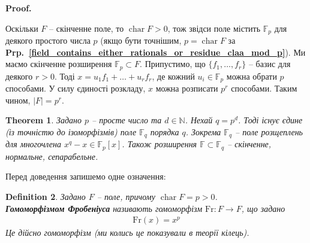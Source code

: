\documentclass[a4paper, 10pt]{article}
\makeatletter
\theoremstyle{theoremdd}
\newtheorem{theorem}{Theorem}[subsection]
\theoremstyle{theoremdd}
\newtheorem{definition}[theorem]{Definition}
\theoremstyle{theoremdd}
\theoremstyle{theoremdd}
\theoremstyle{theoremdd}
\theoremstyle{theoremdd}
\theoremstyle{theoremdd}
\theoremstyle{theoremdd}
\theoremstyle{theoremdd}
\theoremstyle{theoremdd}
\theoremstyle{theoremdd}
\theoremstyle{theoremdd}
\theoremstyle{theoremdd}
\theoremstyle{theoremdd}
\theoremstyle{theoremdd}
\renewenvironment{proof}[1][Proof.\\]{\par
\pushQED{\hfill \qed}%
\normalfont \topsep6\p@\@plus6\p@\relax
\trivlist
\item\relax
{\bfseries
#1\@addpunct{.}}\hspace\labelsep\ignorespaces
}{%
\popQED\endtrivlist\@endpefalse
}
\DeclareMathOperator{\charac}{char}
\newcommand\prpref[1]{\textbf{Prp.~\ref{#1}}}
\makeatother
\begin{document}
\begin{proof}
Оскільки $F$ -- скінченне поле, то $\charac F > 0$, тож звідси поле містить $\mathbb{F}_p$ для деякого простого числа $p$ (якщо бути точнішим, $p = \charac F$ за \prpref{field_contains_either_rationals_or_residue_claa_mod_p}). Ми маємо скінченне розширення $\mathbb{F}_p \subset F$. Припустимо, що $\{f_1,\dots,f_r\}$ -- базис для деякого $r > 0$. Тоді $x = u_1 f_1 + \dots + u_r f_r$, де кожний $u_i \in \mathbb{F}_p$ можна обрати $p$ способами. У силу єдиності розкладу, $x$ можна розписати $p^r$ способами. Таким чином, $|F| = p^r$.
\end{proof}

\begin{theorem}
Задано $p$ -- просте число та $d \in \mathbb{N}$. Нехай $q = p^d$. Тоді існує єдине (із точністю до ізоморфізмів) поле $\mathbb{F}_q$ порядка $q$. Зокрема $\mathbb{F}_q$ -- поле розщеплень для многочлена $x^q - x \in \mathbb{F}_p[x]$. Також розширення $\mathbb{F} \subset \mathbb{F}_q$ -- скінченне, нормальне, сепарабельне.
\end{theorem}

Перед доведення запишемо одне означення:
\begin{definition}
Задано $F$ -- поле, причому $\charac F = p > 0$.\\
\textbf{Гомоморфізмом Фробеніуса} називають гомоморфізм $\text{Fr} \colon F \to F$, що задано
\begin{align*}
\text{Fr}(x) = x^p
\end{align*}
Це дійсно гомоморфізм (ми колись це показували в теорії кілець).
\end{definition}
\end{document}
